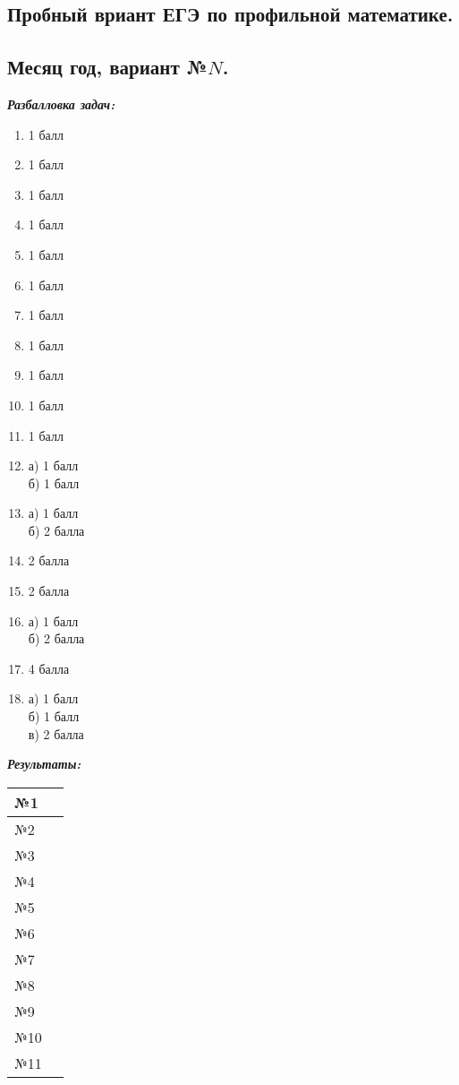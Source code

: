 \documentclass[12pt]{article}
\begin{document}
\pagestyle{empty}
\begin{landscape}
\begin{center}
    \section*{Пробный вриант  ЕГЭ по профильной математике.}
    \subsection*{Месяц год, вариант №$N$.}
\end{center}
\begin{multicols}{2}
    \textbf{\textit{Разбалловка задач:}}
    \begin{enumerate}[start=1,label={\itshape\bfseries \arabic*.}]
        \item 1 балл
        \item 1 балл
        \item 1 балл
        \item 1 балл
        \item 1 балл
        \item 1 балл
        \item 1 балл
        \item 1 балл
        \item 1 балл
        \item 1 балл
        \item 1 балл
        \item а) 1 балл\\
                б) 1 балл
        \item а) 1 балл\\
            б) 2 балла
        \item 2 балла
        \item 2 балла
        \item а) 1 балл\\
            б) 2 балла
        \item 4 балла
        \item а) 1 балл\\
            б) 1 балл\\
            в) 2 балла
    \end{enumerate}
    \columnbreak

    \textbf{\textit{Результаты:}}\\

    \begin{tabular}{ | l || l |   }
    \hline
    №1 &  \hspace{10mm} \\ \hline
    №2 &  \\ \hline
    №3 &  \\ \hline
    №4 &  \\ \hline
    №5 &  \\ \hline
    №6 &  \\ \hline
    №7 &  \\ \hline
    №8 &  \\ \hline
    №9 &  \\ \hline
    №10 &  \\ \hline
    №11 &  \\ \hline
    \hline


\end{tabular}
\end{multicols}
\end{landscape}
\end{document}
